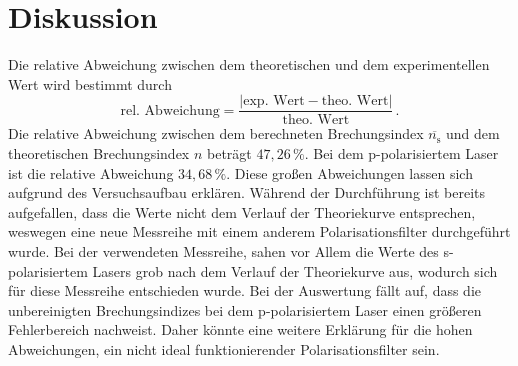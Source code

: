 \section{Diskussion}
\label{sec:Diskussion}
Die relative Abweichung zwischen dem theoretischen und dem experimentellen Wert wird bestimmt durch
$$\text{rel. Abweichung} = \frac{|\text{exp. Wert} - \text{theo. Wert}|}{\text{theo. Wert}}\,.$$
Die relative Abweichung zwischen dem berechneten Brechungsindex $\overline{n_{\text{s}}}$ und dem theoretischen Brechungsindex $n$
beträgt $47,26\,\%$. Bei dem p-polarisiertem Laser ist die relative Abweichung $34,68\,\%$. Diese großen Abweichungen lassen sich 
aufgrund des Versuchsaufbau erklären. Während der Durchführung ist bereits aufgefallen, dass die Werte nicht dem Verlauf der Theoriekurve
entsprechen, weswegen eine neue Messreihe mit einem anderem Polarisationsfilter durchgeführt wurde. Bei der verwendeten Messreihe, sahen vor Allem die Werte des s-polarisiertem 
Lasers grob nach dem Verlauf der Theoriekurve aus, wodurch sich für diese Messreihe entschieden wurde. Bei der Auswertung fällt auf, dass die unbereinigten Brechungsindizes bei dem 
p-polarisiertem Laser einen größeren Fehlerbereich nachweist. Daher könnte eine weitere Erklärung für die hohen Abweichungen, ein nicht ideal funktionierender
Polarisationsfilter sein. 
